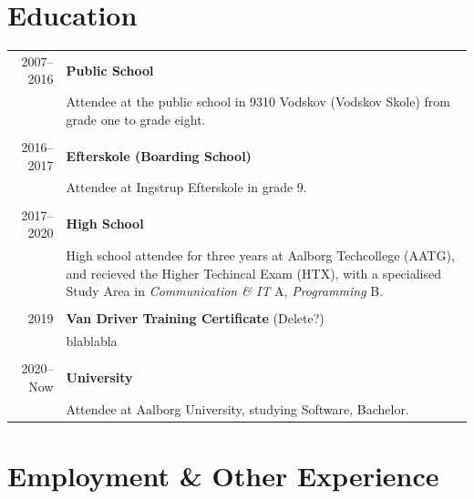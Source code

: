 \documentclass{article}
\begin{document}
    \section*{Education}
    \begin{tabular}{r|p{.82\linewidth}} 
        2007--2016 & \textbf{Public School}\\
        &   Attendee at the public school in 9310 Vodskov (Vodskov Skole) from grade one to grade eight.
        \\\\
        2016--2017 & \textbf{Efterskole (Boarding School)}\\
    &   Attendee at Ingstrup Efterskole in grade 9.
        \\\\
        2017--2020 & \textbf{High School}\\
        &   High school attendee for three years at Aalborg Techcollege (AATG), and recieved the Higher
            Techincal Exam (HTX), with a specialised Study Area in \textit{Communication \& IT} A,
            \textit{Programming} B.
        \\\\
        2019 & \textbf{Van Driver Training Certificate } (Delete?)\\
    &   blablabla
        \\\\
        2020--Now & \textbf{University}\\
    &   Attendee at Aalborg University, studying Software, Bachelor.
    \end{tabular}
 
    \section*{Employment \& Other Experience}
\end{document}
